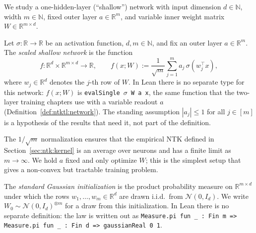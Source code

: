 We study a one-hidden-layer (``shallow'') network with input dimension $d \in \mathbb{N}$,
width $m \in \mathbb{N}$, fixed outer layer $a \in \mathbb{R}^m$, and variable inner weight
matrix $W \in \mathbb{R}^{m \times d}$.

\begin{definition}\label{def:ntk:shallowNetwork}
  \leanok
Let $\sigma : \mathbb{R} \to \mathbb{R}$ be an activation function, $d, m \in \mathbb{N}$,
and fix an outer layer $a \in \mathbb{R}^m$.
The \emph{scaled shallow network} is the function
\[
  f : \mathbb{R}^d \times \mathbb{R}^{m \times d} \to \mathbb{R}, \qquad
  f(x; W) := \frac{1}{\sqrt{m}} \sum_{j=1}^{m} a_j \, \sigma(w_j^\top x),
\]
where $w_j \in \mathbb{R}^d$ denotes the $j$-th row of $W$.
In Lean there is no separate type for this network: $f(x;W)$ is \texttt{evalSingle $\sigma$ W a x},
the same function that the two-layer training chapters use with a variable readout $a$
(Definition~\ref{def:ntktl:network}). The standing assumption $|a_j| \le 1$ for all $j \in [m]$
is a hypothesis of the results that need it, not part of the definition.
\end{definition}

\begin{remark}
The $1/\sqrt{m}$ normalization ensures that the empirical NTK defined in
Section~\ref{sec:ntk:kernel} is an average over neurons and has a finite limit as $m \to \infty$.
We hold $a$ fixed and only optimize $W$; this is the simplest setup that gives a
non-convex but tractable training problem.
\end{remark}

\begin{definition}\label{def:ntk:gaussianInit}
  \leanok
The \emph{standard Gaussian initialization} is the product probability measure on
$\mathbb{R}^{m \times d}$ under which the rows $w_1, \ldots, w_m \in \mathbb{R}^d$ are
drawn i.i.d.\ from $\mathcal{N}(0, I_d)$.
We write $W_0 \sim \mathcal{N}(0, I_d)^{\otimes m}$ for a draw from this initialization.
In Lean there is no separate definition: the law is written out as
\texttt{Measure.pi fun \_ : Fin m => Measure.pi fun \_ : Fin d => gaussianReal 0 1}.
\end{definition}

